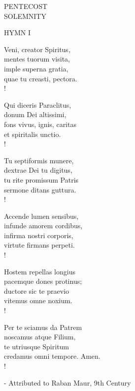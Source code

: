 \begin{center}\normalsize PENTECOST\\
\footnotesize SOLEMNITY\\
\end{center}

\noindent\small{\uppercase{Hymn I}}\normalsize\label{pentecost:firstHymn}
\begin{cverse}
Veni, creator Spiritus,\\
mentes tuorum visita,\\
imple superna gratia,\\
quae tu creasti, pectora.\\!

Qui diceris Paraclitus,\\
donum Dei altissimi,\\
fons vivus, ignis, caritas\\
et spiritalis unctio.\\!

Tu septiformis munere,\\
dextrae Dei tu digitus,\\
tu rite promissum Patris\\
sermone ditans guttura.\\!

Accende lumen sensibus,\\
infunde amorem cordibus,\\
infirma nostri corporis,\\
virtute firmans perpeti.\\!

Hostem repellas longius\\
pacemque dones protinus;\\
ductore sic te praevio\\
vitemus omne noxium.\\!

Per te sciamus da Patrem\\
noscamus atque Filium,\\
te utriusque Spiritum\\
credamus omni tempore. Amen.\\!
\end{cverse}
\begin{flushright}\tiny - Attributed to Raban Maur, 9th Century\end{flushright}

